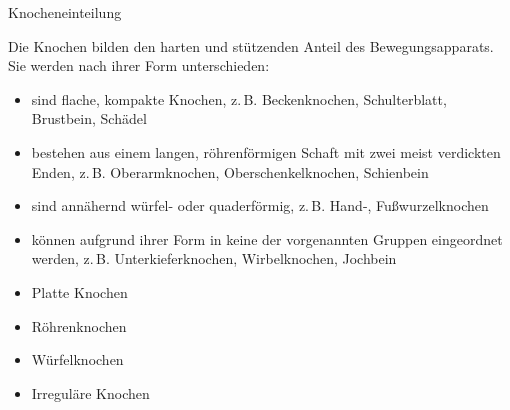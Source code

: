 \TextSlide
{Knocheneinteilung}
{%
Die Knochen bilden den harten 
und stützenden Anteil des Bewegungsapparats. 
%
Sie werden nach ihrer Form unterschieden: 
% 
\begin{itemize}
    \item {} 
    sind flache, kompakte Knochen, z.\,B. Beckenknochen,
    Schulterblatt, Brustbein, Schädel
    \item {}
    bestehen aus einem langen, röhrenförmigen Schaft mit zwei meist verdickten Enden, 
    z.\,B. Oberarmknochen, Oberschenkelknochen, Schienbein
    \item {} 
    sind annähernd würfel- oder quaderförmig, 
    z.\,B. Hand-, Fußwurzelknochen
    \item {}
    können aufgrund ihrer Form in keine der vorgenannten Gruppen eingeordnet werden, 
    z.\,B. Unterkieferknochen, Wirbelknochen, Jochbein
\end{itemize}
}
{
\begin{itemize}
  \item Platte Knochen
  \item Röhrenknochen
  \item Würfelknochen
  \item Irreguläre Knochen
\end{itemize}
}
{}{}{}


